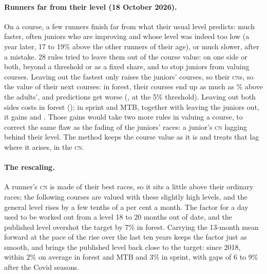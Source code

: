 \documentclass[11pt,a4paper]{article}
\newcommand{\CN}{\textsc{cn}}
\begin{document}
\paragraph{Runners far from their level (18 October 2026).} On a course, a few runners finish far from what their usual level predicts: much faster, often juniors who are improving and whose level was indeed too low (a year later, 17 to 19\% above the other runners of their age), or much slower, after a mistake. 28 rules tried to leave them out of the course value: on one side or both, beyond a threshold or as a fixed share, and to stop juniors from valuing courses. Leaving out the fastest only raises the juniors' courses, so their \CN s, so the value of their next courses: in forest, their courses end up as much as \NoutLoop\% above the adults', and predictions get worse (\NoutFast, \NoutFastFive{} at the 5\% threshold). Leaving out both sides costs in forest (\NoutBothF); in sprint and MTB, together with leaving the juniors out, it gains \NoutXS{} and \NoutXV. Those gains would take two more rules in valuing a course, to correct the same flaw as the fading of the juniors' races: a junior's \CN{} lagging behind their level. The method keeps the course value as it is and treats that lag where it arises, in the \CN.

\paragraph{The rescaling.} A runner's \CN{} is made of their best races, so it sits a little above their ordinary races; the following courses are valued with these slightly high levels, and the general level rises by a few tenths of a per cent a month. The factor for a day used to be worked out from a level 18 to 20 months out of date, and the published level overshot the target by 7\% in forest. Carrying the 13-month mean forward at the pace of the rise over the last ten years keeps the factor just as smooth, and brings the published level back close to the target: since 2018, within 2\% on average in forest and MTB and 3\% in sprint, with gaps of 6 to 9\% after the Covid seasons.
\end{document}
